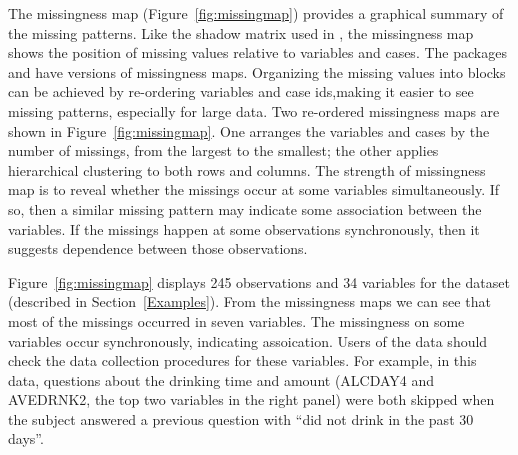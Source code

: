 \documentclass[article]{jss}
\begin{document}
The missingness map (Figure~\ref{fig:missingmap}) provides a
graphical summary of the missing patterns. Like the shadow
matrix used in , the missingness map shows
the position of missing values relative to variables and cases.
The  packages  \citep{amelia} and
 \citep{VIM} have versions of missingness maps.
Organizing the missing values into blocks can be achieved by
re-ordering variables and case ids,making it easier to see
missing patterns, especially for large data. Two re-ordered
missingness maps are shown in Figure~\ref{fig:missingmap}.
One arranges the variables and cases by the number of missings,
from the largest to the smallest; the other applies hierarchical
clustering to both rows and columns. The strength of missingness
map is to reveal whether the missings occur at some variables
simultaneously. If so, then a similar missing pattern may
indicate some association between the variables. If the missings
happen at some observations synchronously, then it suggests
dependence between those observations.

Figure~\ref{fig:missingmap} displays 245 observations and
34 variables for the dataset  (described in
Section~\ref{Examples}). From the missingness maps we can see
that most of the missings occurred in seven variables. The
missingness on some variables occur synchronously, indicating
assoication. Users of the data should check the data collection
procedures for these variables. For example, in this data,
questions about the drinking time and amount (ALCDAY4 and
AVEDRNK2, the top two variables in the right panel) were both
skipped when the subject answered a previous question with
``did not drink in the past 30 days''. 
\end{document}
